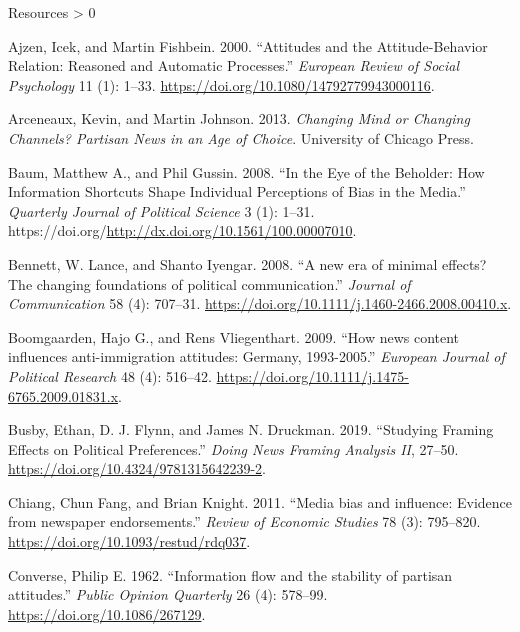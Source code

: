 \documentclass[
  ignorenonframetext,
]{beamer}
\newlength{\cslhangindent}
\newenvironment{CSLReferences}[2] %
 {%
  \setlength{\parindent}{0pt}
  \ifodd #1 \everypar{\setlength{\hangindent}{\cslhangindent}}\ignorespaces\fi
  \ifnum #2 > 0
  \setlength{\parskip}{#2\baselineskip}
  \fi
 }%
 {}
\begin{document}
\begin{frame}[allowframebreaks]{Resources}
\protect\hypertarget{resources-1}{}
\hypertarget{refs}{}
\begin{CSLReferences}{1}{0}
\leavevmode\hypertarget{ref-Ajzen2000}{}%
Ajzen, Icek, and Martin Fishbein. 2000. {``{Attitudes and the
Attitude-Behavior Relation: Reasoned and Automatic Processes}.''}
\emph{European Review of Social Psychology} 11 (1): 1--33.
\url{https://doi.org/10.1080/14792779943000116}.

\leavevmode\hypertarget{ref-Arceneaux2013}{}%
Arceneaux, Kevin, and Martin Johnson. 2013. \emph{{Changing Mind or
Changing Channels? Partisan News in an Age of Choice}}. University of
Chicago Press.

\leavevmode\hypertarget{ref-Baum2008}{}%
Baum, Matthew A., and Phil Gussin. 2008. {``{In the Eye of the Beholder:
How Information Shortcuts Shape Individual Perceptions of Bias in the
Media}.''} \emph{Quarterly Journal of Political Science} 3 (1): 1--31.
https://doi.org/\url{http://dx.doi.org/10.1561/100.00007010}.

\leavevmode\hypertarget{ref-Bennett2008}{}%
Bennett, W. Lance, and Shanto Iyengar. 2008. {``{A new era of minimal
effects? The changing foundations of political communication}.''}
\emph{Journal of Communication} 58 (4): 707--31.
\url{https://doi.org/10.1111/j.1460-2466.2008.00410.x}.

\leavevmode\hypertarget{ref-Boomgaarden2009}{}%
Boomgaarden, Hajo G., and Rens Vliegenthart. 2009. {``{How news content
influences anti-immigration attitudes: Germany, 1993-2005}.''}
\emph{European Journal of Political Research} 48 (4): 516--42.
\url{https://doi.org/10.1111/j.1475-6765.2009.01831.x}.

\leavevmode\hypertarget{ref-Busby2019}{}%
Busby, Ethan, D. J. Flynn, and James N. Druckman. 2019. {``{Studying
Framing Effects on Political Preferences}.''} \emph{Doing News Framing
Analysis II}, 27--50. \url{https://doi.org/10.4324/9781315642239-2}.

\leavevmode\hypertarget{ref-Chiang2011a}{}%
Chiang, Chun Fang, and Brian Knight. 2011. {``{Media bias and influence:
Evidence from newspaper endorsements}.''} \emph{Review of Economic
Studies} 78 (3): 795--820. \url{https://doi.org/10.1093/restud/rdq037}.

\leavevmode\hypertarget{ref-Converse1962}{}%
Converse, Philip E. 1962. {``{Information flow and the stability of
partisan attitudes}.''} \emph{Public Opinion Quarterly} 26 (4): 578--99.
\url{https://doi.org/10.1086/267129}.


\end{CSLReferences}
\end{frame}
\end{document}
